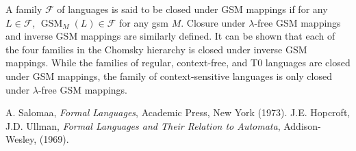 \documentclass[12pt]{article}
\begin{document}
A family $\mathscr{F}$ of languages is said to be closed under GSM mappings if for any $L\in \mathscr{F}$, $\operatorname{GSM}_M(L)\in \mathscr{F}$ for any gsm $M$.  Closure under $\lambda$-free GSM mappings and inverse GSM mappings are similarly defined.  It can be shown that each of the four families in the Chomsky hierarchy is closed under inverse GSM mappings.  While the families of regular, context-free, and T0 languages are closed under GSM mappings, the family of context-sensitive languages is only closed under $\lambda$-free GSM mappings.

\begin{thebibliography}{9}
 A. Salomaa, {\em Formal Languages}, Academic Press, New York (1973).
 J.E. Hopcroft, J.D. Ullman, {\em Formal Languages and Their Relation to Automata}, Addison-Wesley, (1969).
\end{thebibliography}
\end{document}

